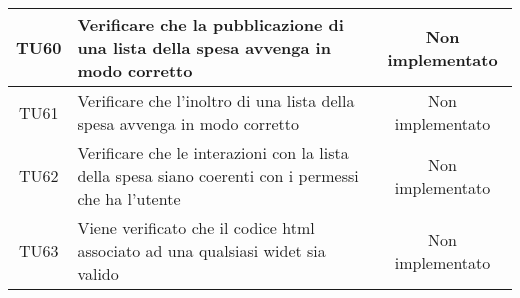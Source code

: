 \begin{center}
\begin{longtable}{|c|>{\centering}m{10cm}|c|}
		TU60 & Verificare che la pubblicazione di una lista della spesa avvenga in modo corretto & Non implementato \\ \hline
		TU61 & Verificare che l'inoltro di una lista della spesa avvenga in modo corretto & Non implementato \\ \hline
		TU62 & Verificare che le interazioni con la lista della spesa siano coerenti con i permessi che ha l'utente & Non implementato \\ \hline
		TU63 & Viene verificato che il codice html associato ad una qualsiasi widet sia valido & Non implementato \\ \hline
	\end{longtable}
\end{center}
